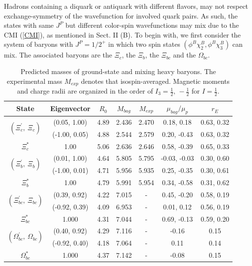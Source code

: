 \documentclass[prd,twocolumn,floatfix,nofootinbib]{revtex4}
\begin{document}
Hadrons containing a diquark or antiquark with different flavors, may not
respect exchange-symmetry of the wavefunction for involved quark pairs. As
such, the states with same $J^{P}$ but different color-spin wavefunctions
may mix due to the CMI (\ref{CMI}), as mentioned in Sect. II (B). To begin
with, we first consider the system of baryons with $J^{P}={1/2}^{+}$ in
which two spin states $(\phi ^{B}\chi _{2}^{B},\phi ^{B}\chi _{3}^{B})$ can
mix. The associated baryons are the $\Xi _{c}$, the $\Xi _{b}$, the $\Xi
_{bc}$ and the $\Omega _{bc}$.

\renewcommand{\tabcolsep}{0.55cm} \renewcommand{\arraystretch}{1.3}
\begin{table}[!htb]
\caption{Predicted masses of ground-state and mixing heavy baryons. The
experimental mass $M_{exp}$ denotes that isospin-averaged. Magnetic moments
and charge radii are organized in the order of $I_{3}=\frac{1}{2},\,-\frac{1%
}{2}$ for $I=\frac{1}{2}$.}
\label{tab:mixingbaryon}%
\begin{tabular}{ccccccc}
\hline\hline
\textrm{State} & \textrm{Eigenvector} & $R_{0}$ & $M_{bag}$ & $M_{exp}$ & $%
\mu_{bag}/\mu_{p}$ & $r_{E}$ \\ \hline
\multirow{2}{*}{$\left(\Xi_{c}^{\prime},\ \Xi_{c}\right)$} & (0.05, 1.00) &
4.89 & 2.436 & 2.470 & 0.18, 0.18 & 0.63, 0.32 \\
& (-1.00, 0.05) & 4.88 & 2.544 & 2.579 & 0.20, -0.43 & 0.63, 0.32 \\
$\Xi_{c}^{\ast}$ & 1.00 & 5.06 & 2.636 & 2.646 & 0.58, -0.39 & 0.65, 0.33 \\
\multirow{2}{*}{$\left(\Xi_{b}^{\prime},\ \Xi_{b}\right)$} & (0.01, 1.00) &
4.64 & 5.805 & 5.795 & -0.03, -0.03 & 0.30, 0.60 \\
& (-1.00, 0.01) & 4.71 & 5.956 & 5.935 & 0.25, -0.35 & 0.30, 0.61 \\
$\Xi_{b}^{\ast}$ & 1.00 & 4.79 & 5.991 & 5.954 & 0.34, -0.58 & 0.31, 0.62 \\
\multirow{2}{*}{$\left(\Xi_{bc}^{\prime},\ \Xi_{bc}\right)$} & (0.39, 0.92)
& 4.22 & 7.015 & - & 0.45, -0.20 & 0.58, 0.19 \\
& (-0.92, 0.39) & 4.09 & 6.953 & - & 0.01, 0.12 & 0.56, 0.19 \\
$\Xi_{bc}^{\ast}$ & 1.000 & 4.31 & 7.044 & - & 0.69, -0.13 & 0.59, 0.20 \\
\multirow{2}{*}{$\left(\Omega_{bc}^{\prime},\ \Omega_{bc}\right)$} & (0.40,
0.92) & 4.29 & 7.116 & - & -0.16 & 0.15 \\
& (-0.92, 0.40) & 4.18 & 7.064 & - & 0.11 & 0.14 \\
$\Omega_{bc}^{\ast}$ & 1.000 & 4.37 & 7.142 & - & -0.08 & 0.15 \\
\hline\hline
\end{tabular}%
\end{table}
\end{document}
